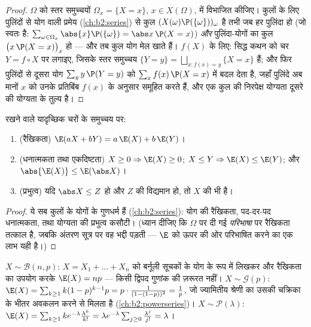 \begin{proof}
$\Omega$ को स्तर समुच्चयों $\Omega_x = \{X = x\}$, $x
\in X(\Omega)$, में विभाजित कीजिए।  कुलों के
लिए पुलिंदों से योग वाली प्रमेय (\cref{ch:b2:series}) से कुल $(X(\omega)\P(\{\omega\}))_\omega$  है तभी जब
हर पुलिंदा  हो (जो स्वतः है: $\sum_{\omega \in \Omega_x}\abs{x}\P(\{\omega\}) =
\abs x\,\P(X = x)$) \emph{और} पुलिंदा-योगों का
कुल $\bigl(x\,\P(X = x)\bigr)_x$  हो --- और तब कुल योग मेल खाते हैं। $f(X)$ के लिए: सिद्ध
कथन को चर $Y =
f \circ X$ पर लगाइए, जिसके स्तर समुच्चय $\{Y = y\} =
\bigsqcup_{x : f(x) = y}\{X = x\}$ हैं; और फिर
पुलिंदों से दूसरा योग $\sum_y y\,\P(Y = y)$ को $\sum_x
f(x)\,\P(X = x)$ में बदल देता है, जहाँ पुलिंदे
अब मानों $x$ को उनके प्रतिबिंब $f(x)$ के अनुसार समूहित करते हैं,
और एक कुल की निरपेक्ष योग्यता दूसरे की योग्यता के तुल्य है।
\end{proof}

\begin{theorem}[प्रत्याशा के गुणधर्म]\label{thm:b2:randomvar:linearity}
 रखने वाले यादृच्छिक चरों के समुच्चय पर:
\begin{enumerate}
\item (रैखिकता) $\E(aX + bY) = a\,\E(X) + b\,\E(Y)$।
\item (धनात्मकता तथा एकदिष्टता) $X \geq 0 \Rightarrow \E(X)
\geq 0$; $X \leq Y \Rightarrow \E(X) \leq \E(Y)$; और $\abs{\E(X)} \leq \E(\abs X)$।
\item (प्रभुत्व) यदि $\abs X \leq Z$ हो और $Z$ की  विद्यमान हो, तो
$X$ की भी है।
\end{enumerate}
\end{theorem}

\begin{proof}
ये सब  कुलों के योगों के गुणधर्म हैं (\cref{ch:b2:series}): योग की रैखिकता,
पद-दर-पद धनात्मकता, तथा योग्यता की प्रभुत्व कसौटी। (ध्यान दीजिए कि
$\Omega$ पर दी गई \emph{परिभाषा} पर रैखिकता तत्काल है, जबकि अंतरण सूत्र
पर वह भद्दी पड़ती --- $\E$ को ऊपर की ओर परिभाषित करने का एक लाभ यही
है।)
\end{proof}

\begin{example}\label{ex:b2:randomvar:expectations}
$X \sim \mathcal{B}(n, p)$: $X = X_1 + \dots + X_n$ को बर्नूली सूचकों के योग के रूप में लिखकर और रैखिकता का
उपयोग करके $\E(X) = np$ --- किसी द्विपद गुणांक की ज़रूरत नहीं। $X \sim \mathcal{G}(p)$: $\E(X) =
\sum_{k\geq1}k(1-p)^{k-1}p = p\cdot\frac{1}{(1 - (1-p))^2} =
\frac1p$, जो
ज्यामितीय श्रेणी का उसकी चक्रिका के भीतर अवकलन करने से मिलता है
(\cref{ch:b2:powerseries})। $X \sim \mathcal{P}(\lambda)$: $\E(X)
= \sum_{k\geq1}k e^{-\lambda}\frac{\lambda^k}{k!} = \lambda
e^{-\lambda}\sum_{j\geq0}\frac{\lambda^j}{j!} = \lambda$।
\end{example}

